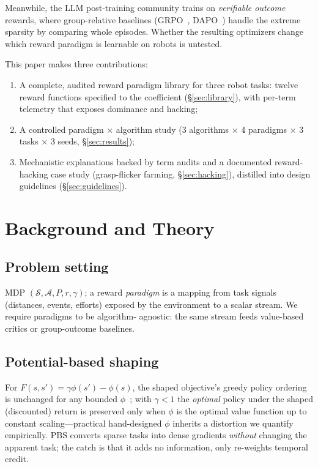 \documentclass[journal,twoside]{IEEEtran}
\begin{document}
Meanwhile, the LLM post-training community trains on \emph{verifiable
outcome} rewards, where group-relative baselines (GRPO~\cite{shao2024grpo},
DAPO~\cite{yu2025dapo}) handle the extreme sparsity by comparing whole
episodes. Whether the resulting optimizers change which reward paradigm is
learnable on robots is untested.

This paper makes three contributions:
\begin{enumerate}
\item A complete, audited reward paradigm library for three robot tasks:
twelve reward functions specified to the coefficient
(\S\ref{sec:library}), with per-term telemetry that exposes dominance and
hacking;
\item A controlled paradigm $\times$ algorithm study
(3 algorithms $\times$ 4 paradigms $\times$ 3 tasks $\times$ 3 seeds,
\S\ref{sec:results});
\item Mechanistic explanations backed by term audits and a documented
reward-hacking case study (grasp-flicker farming, \S\ref{sec:hacking}),
distilled into design guidelines (\S\ref{sec:guidelines}).
\end{enumerate}

\section{Background and Theory}
\label{sec:theory}
\subsection{Problem setting}
MDP $(\mathcal S,\mathcal A,P,r,\gamma)$; a reward \emph{paradigm} is a
mapping from task signals (distances, events, efforts) exposed by the
environment to a scalar stream. We require paradigms to be algorithm-
agnostic: the same stream feeds value-based critics or group-outcome
baselines.

\subsection{Potential-based shaping}
For $F(s,s')=\gamma\phi(s')-\phi(s)$, the shaped objective's greedy policy
ordering is unchanged for any bounded $\phi$~\cite{ng1999policy}; with
$\gamma<1$ the \emph{optimal} policy under the shaped (discounted) return
is preserved only when $\phi$ is the optimal value function up to constant
scaling---practical hand-designed $\phi$ inherits a distortion we quantify
empirically. PBS converts sparse tasks into dense gradients \emph{without}
changing the apparent task; the catch is that it adds no information, only
re-weights temporal credit.
\end{document}
